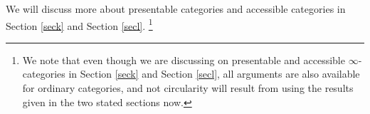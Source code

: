 
We will discuss more about presentable categories and accessible categories in Section \ref{seck} and Section \ref{secl}.
\footnote{We note that even though we are discussing on presentable and accessible $\infty$-categories in Section \ref{seck}
and Section \ref{secl}, all arguments are also available for ordinary categories, and not circularity will result from
using the results given in the two stated sections now.}
